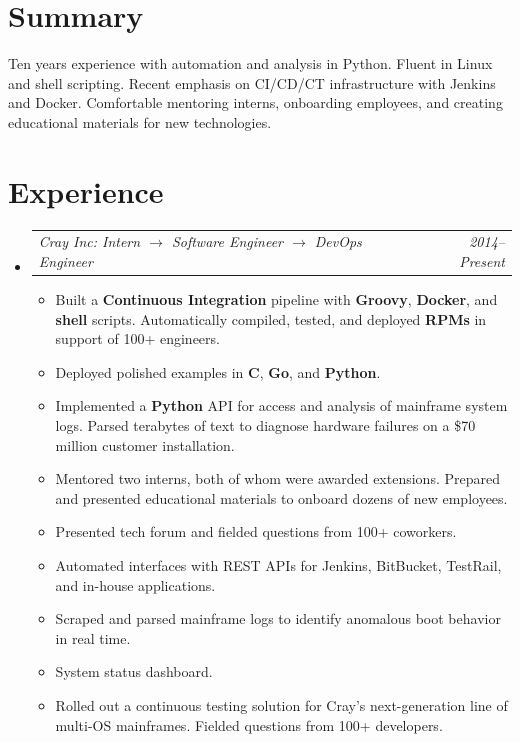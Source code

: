 \documentclass[12pt,letterpaper]{article}
\makeatletter
\newcommand{\headerpair}[2]{
    \begin{tabular*}{\linewidth}{l@{ \extracolsep{\fill} }r} {\large\emph{#1}} & {\large\emph{#2}}
    \end{tabular*}
}
\newcommand{\headerrow}[3]{\headerpair{#2: #1}{#3}}
\newcommand{\YearRange}[2]{#1--#2}
\newcommand{\ResumeSection}[1]{\section*{{\color{MidnightBlue}#1 \sout{\hfill}}}}
\newcommand{\CPP}{C\nolinebreak[4]\hspace{-.05em}\raisebox{.22ex}{\footnotesize\bf ++}\xspace}
\makeatother
\begin{document}
\ResumeSection{Summary}

Ten years experience with automation and analysis in Python. Fluent in Linux and shell scripting. Recent emphasis on CI/CD/CT infrastructure with Jenkins and Docker. Comfortable mentoring interns, onboarding employees, and creating educational materials for new technologies.

\ResumeSection{Experience}

\begin{itemize}[leftmargin=\parindent]
    \parskip=0.1em
    \itemsep=1.2em
    \item[]
        \headerrow
            {Intern $\to$ Software Engineer $\to$ DevOps Engineer}
            {Cray Inc}
            {\YearRange{2014}{Present}}
        \begin{itemize}[leftmargin=\parindent]
            \item Built a \textbf{Continuous Integration} pipeline with \textbf{Groovy}, \textbf{Docker}, and \textbf{shell} scripts. Automatically compiled, tested, and deployed \textbf{RPMs} in support of 100+ engineers.
            \item Deployed polished examples in \textbf{\CPP}, \textbf{Go}, and \textbf{Python}.
            \item Implemented a \textbf{Python} API for access and analysis of mainframe system logs. Parsed terabytes of text to diagnose hardware failures on a \$70 million customer installation.
            \item Mentored two interns, both of whom were awarded extensions. Prepared and presented educational materials to onboard dozens of new employees.
            \item Presented tech forum and fielded questions from 100+ coworkers.
            \item Automated interfaces with REST APIs for Jenkins, BitBucket, TestRail, and in-house applications.
            \item Scraped and parsed mainframe logs to identify anomalous boot behavior in real time.

            \item System status dashboard.
            \item Rolled out a continuous testing solution for Cray's next-generation line of multi-OS mainframes. Fielded questions from 100+ developers.






\end{itemize}
\end{itemize}
\end{document}
